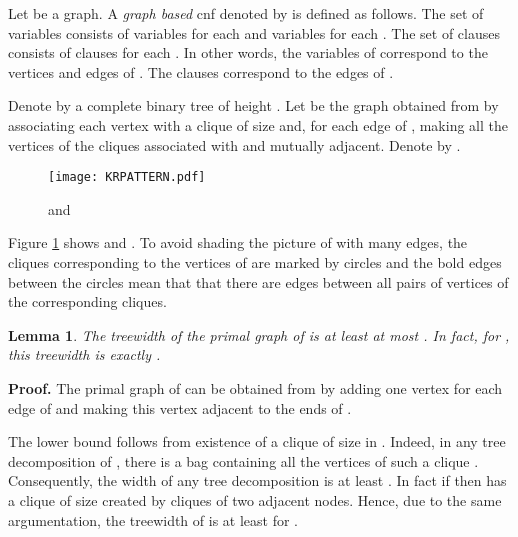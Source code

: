 \documentclass{article}
\newtheorem{lemma}{Lemma}
\begin{document}
Let  be a graph. A \emph{graph based} {\sc cnf} denoted by  is defined as follows. 
The set of variables consists of variables  for each 
and variables  for each . 
The set of clauses consists of clauses 
for each . In other words, the variables of  correspond to the vertices
and edges of . The clauses correspond to the edges of . 

\begin{comment}
\footnote{In other words, each edge corresponds
to exactly one variable for which the order of indices in the subscript does not matter. 
The same is true regarding the clauses.}.
\end{comment}



\begin{comment}
Next, we define a notion of \emph{clique} graph.
Let  be a graph. Then a graph denoted by 
is defined as follows. Associate each vertex of  with a clique
of size . For each edge  of  make all the vertices
of the cliques associated with  and  mutually adjacent.
\end{comment}

Denote by  a complete binary tree of height .
Let  be the graph obtained from  by associating each vertex
with a clique of size  and, for each edge  of , making all the vertices
of the cliques associated with  and  mutually adjacent.
Denote  by . 

\begin{figure}[h]
\centering
\texttt{[image: KRPATTERN.pdf]}
\caption{ and }
\label{TWPattern}
\end{figure}

Figure \ref{TWPattern} shows  and .
To avoid shading the picture of  with many edges,
the cliques corresponding to the vertices of  are marked
by circles and the bold edges between the circles mean that
that there are edges between all pairs of vertices of the corresponding 
cliques. 

\begin{lemma} \label{twf}
The treewidth of the primal graph of  is at least  at most . 
In fact, for , this treewidth is exactly . 
\end{lemma}

{\bf Proof.}
The primal graph of  can be obtained from 
by adding one vertex  for each edge  of  and
making this vertex adjacent to the ends of .

The lower bound follows from existence of a clique of size  in .
Indeed, in any tree decomposition of , there is a bag containing
all the vertices of such a clique \cite{BodlaenderM93}. Consequently, the
width of any tree decomposition is at least . In fact if 
then  has a clique of size  created by cliques of two adjacent
nodes. Hence, due to the same argumentation, the treewidth of 
is at least  for . 
\end{document}
